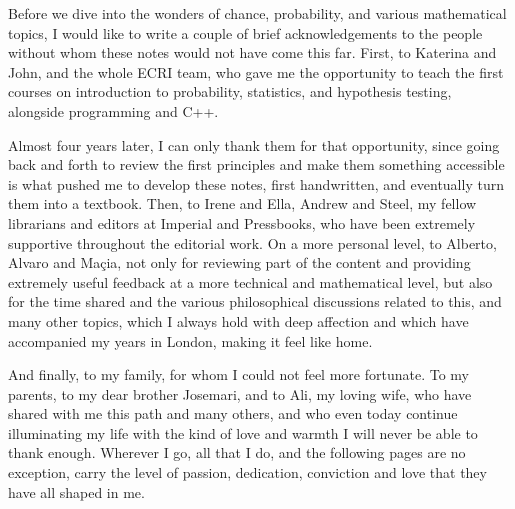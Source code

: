 Before we dive into the wonders of chance, probability, and various mathematical topics, I would like to write a couple of brief acknowledgements to the people without whom these notes would not have come this far. First, to Katerina and John, and the whole ECRI team, who gave me the opportunity to teach the first courses on introduction to probability, statistics, and hypothesis testing, alongside programming and C++.

\medskip

Almost four years later, I can only thank them for that opportunity, since going back and forth to review the first principles and make them something accessible is what pushed me to develop these notes, first handwritten, and eventually turn them into a textbook. Then, to Irene and Ella, Andrew and Steel, my fellow librarians and editors at Imperial and Pressbooks, who have been extremely supportive throughout the editorial work. On a more personal level, to Alberto, Alvaro and Maçia, not only for reviewing part of the content and providing extremely useful feedback at a more technical and mathematical level, but also for the time shared and the various philosophical discussions related to this, and many other topics, which I always hold with deep affection and which have accompanied my years in London, making it feel like home.

\medskip

And finally, to my family, for whom I could not feel more fortunate. To my parents, to my dear brother Josemari, and to Ali, my loving wife, who have shared with me this path and many others, and who even today continue illuminating my life with the kind of love and warmth I will never be able to thank enough. Wherever I go, all that I do, and the following pages are no exception, carry the level of passion, dedication, conviction and love that they have all shaped in me.
